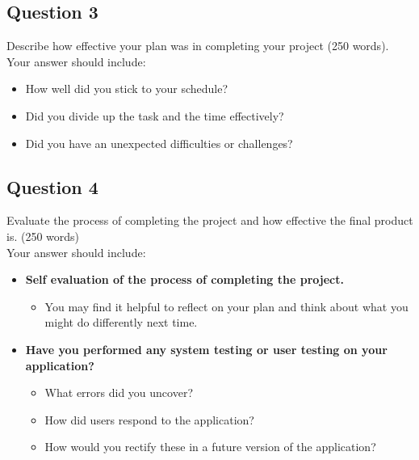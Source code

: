 \subsection*{Question 3}
Describe how effective your plan was in completing your project (250 words).\\
Your answer should include:
\begin{itemize}
  \item How well did you stick to your schedule?
  \item Did you divide up the task and the time effectively?
  \item Did you have an unexpected difficulties or challenges? 
\end{itemize}

\subsection*{Question 4}
Evaluate the process of completing the project and how effective the final product is. (250 words)\\
Your answer should include:
\begin{itemize}
  \item \textbf{Self evaluation of the process of completing the project.}
    \begin{itemize}
      \item You may find it helpful to reflect on your plan and think about what you might do differently next time. 
    \end{itemize}
  \item \textbf{Have you performed any system testing or user testing on your application?}
    \begin{itemize}
      \item What errors did you uncover?
      \item How did users respond to the application?
      \item How would you rectify these in a future version of the application?
    \end{itemize}
\end{itemize}

